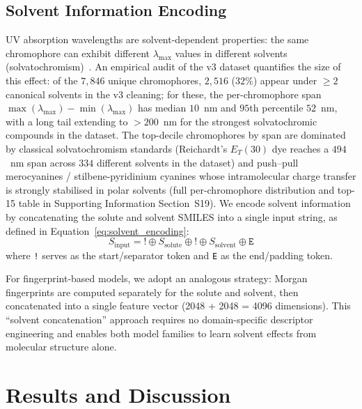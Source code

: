 \documentclass[journal=jcisd8,manuscript=article]{achemso}
\newcommand{\added}[1]{{\color{addedblue}#1}}
\begin{document}
\subsection{Solvent Information Encoding}
\label{sec:solvent}

UV absorption wavelengths are solvent-dependent properties: the same chromophore can exhibit different $\lambda_{\max}$ values in different solvents (solvatochromism)~\cite{reichardt2011solvents}.\added{ An empirical audit of the v3 dataset quantifies the size of this effect: of the $7{,}846$ unique chromophores, $2{,}516$ ($32$\%) appear under $\geq 2$ canonical solvents in the v3 cleaning; for these, the per-chromophore span $\max(\lambda_{\max}) - \min(\lambda_{\max})$ has median $10$~nm and $95$th percentile $52$~nm, with a long tail extending to $> 200$~nm for the strongest solvatochromic compounds in the dataset. The top-decile chromophores by span are dominated by classical solvatochromism standards (Reichardt's $E_T(30)$ dye reaches a $494$~nm span across $334$ different solvents in the dataset) and push--pull merocyanines / stilbene-pyridinium cyanines whose intramolecular charge transfer is strongly stabilised in polar solvents (full per-chromophore distribution and top-15 table in Supporting Information Section~S19).}
We encode solvent information by concatenating the solute and solvent SMILES into a single input string\added{, as defined in Equation~\ref{eq:solvent_encoding}}:
\begin{equation}
\label{eq:solvent_encoding}
 S_{\text{input}} = \texttt{!} \oplus S_{\text{solute}} \oplus \texttt{!} \oplus S_{\text{solvent}} \oplus \texttt{E}
\end{equation}
where \texttt{!} serves as the start/separator token and \texttt{E} as the end/padding token.

For fingerprint-based models, we adopt an analogous strategy: Morgan fingerprints are computed separately for the solute and solvent, then concatenated into a single feature vector (2048 + 2048 = 4096 dimensions).
This ``solvent concatenation'' approach requires no domain-specific descriptor engineering and enables both model families to learn solvent effects from molecular structure alone.


\section{Results and Discussion}
\label{sec:results}

\end{document}

